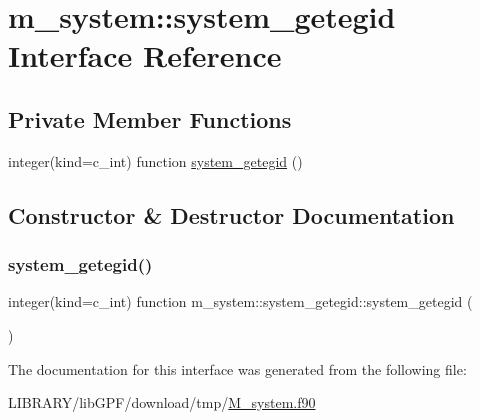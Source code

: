 \hypertarget{interfacem__system_1_1system__getegid}{}\section{m\+\_\+system\+:\+:system\+\_\+getegid Interface Reference}
\label{interfacem__system_1_1system__getegid}
\subsection*{Private Member Functions}
\begin{DoxyCompactItemize}
\item 
integer(kind=c\+\_\+int) function \hyperlink{interfacem__system_1_1system__getegid_a35fcd8b85449dac6703e97290f193ee4}{system\+\_\+getegid} ()
\end{DoxyCompactItemize}


\subsection{Constructor \& Destructor Documentation}
\mbox{\label{interfacem__system_1_1system__getegid_a35fcd8b85449dac6703e97290f193ee4}} 
\subsubsection{\texorpdfstring{system\+\_\+getegid()}{system\_getegid()}}
{\footnotesize\ttfamily integer(kind=c\+\_\+int) function m\+\_\+system\+::system\+\_\+getegid\+::system\+\_\+getegid (\begin{DoxyParamCaption}{ }\end{DoxyParamCaption})\hspace{0.3cm}{\ttfamily [private]}}



The documentation for this interface was generated from the following file\+:\begin{DoxyCompactItemize}
\item 
L\+I\+B\+R\+A\+R\+Y/lib\+G\+P\+F/download/tmp/\hyperlink{M__system_8f90}{M\+\_\+system.\+f90}\end{DoxyCompactItemize}
